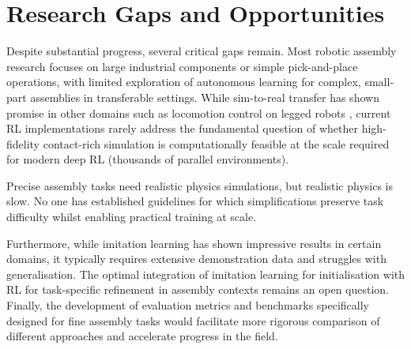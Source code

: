 \documentclass[12pt,a4paper,oneside]{report}
\begin{document}


\section{Research Gaps and Opportunities}

Despite substantial progress, several critical gaps remain. Most robotic assembly research focuses on large industrial components or simple pick-and-place operations, with limited exploration of autonomous learning for complex, small-part assemblies in transferable settings. While sim-to-real transfer has shown promise in other domains such as locomotion control on legged robots \cite{scheuchSimtoRealTransferLocomotionb}, current RL implementations rarely address the fundamental question of whether high-fidelity contact-rich simulation is computationally feasible at the scale required for modern deep RL (thousands of parallel environments).

Precise assembly tasks need realistic physics simulations, but realistic physics is slow. No one has established guidelines for which simplifications preserve task difficulty whilst enabling practical training at scale.

Furthermore, while imitation learning has shown impressive results in certain domains, it typically requires extensive demonstration data and struggles with generalisation. The optimal integration of imitation learning for initialisation with RL for task-specific refinement in assembly contexts remains an open question. Finally, the development of evaluation metrics and benchmarks specifically designed for fine assembly tasks would facilitate more rigorous comparison of different approaches and accelerate progress in the field.
\end{document}
